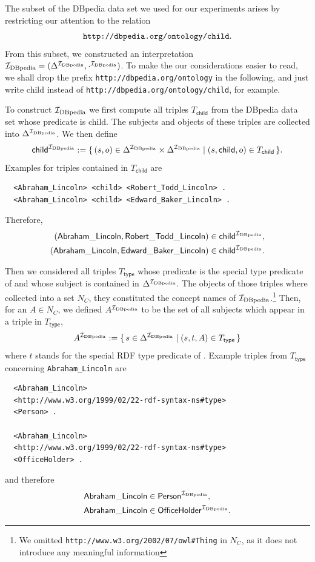 The subset of the DBpedia data set we used for our experiments arises by restricting our
attention to the relation
\begin{equation*}
  \verb|http://dbpedia.org/ontology/child|.
\end{equation*}
From this subset, we constructed an interpretation ${\mathcal{I}_{\text{DBpedia}}} = (\Delta^{{\mathcal{I}_{\text{DBpedia}}}},
\cdot^{{\mathcal{I}_{\text{DBpedia}}}})$.  To make the our considerations easier to read, we shall drop the
prefix \verb|http://dbpedia.org/ontology| in the following, and just write \textsf{child}
instead of \texttt{http://dbpedia.org/ontology/child}, for example.

To construct ${\mathcal{I}_{\text{DBpedia}}}$ we first compute all triples $T_{\mathsf{child}}$ from the
DBpedia data set whose predicate is \textsf{child}.  The subjects and objects of these
triples are collected into $\Delta^{{\mathcal{I}_{\text{DBpedia}}}}$.  We then define
\begin{equation*}
  \mathsf{child}^{{\mathcal{I}_{\text{DBpedia}}}} := {\{\, (s, o) \in \Delta^{\mathcal{I}_{\text{DBpedia}}} \times \Delta^{\mathcal{I}_{\text{DBpedia}}}
    \mid (s, \mathsf{child}, o) \in T_{\mathsf{child}} \,\}}.
\end{equation*}
Examples for triples contained in $T_{\mathsf{child}}$ are
\begin{verbatim}
  <Abraham_Lincoln> <child> <Robert_Todd_Lincoln> .
  <Abraham_Lincoln> <child> <Edward_Baker_Lincoln> .
\end{verbatim}
Therefore,
\begin{align*}
  (\mathsf{Abraham\_Lincoln}, \mathsf{Robert\_Todd\_Lincoln}) &\in \mathsf{child}^{{\mathcal{I}_{\text{DBpedia}}}},\\
  (\mathsf{Abraham\_Lincoln}, \mathsf{Edward\_Baker\_Lincoln}) &\in \mathsf{child}^{{\mathcal{I}_{\text{DBpedia}}}}.
\end{align*}

Then we considered all triples $T_{\mathsf{type}}$ whose predicate is the special type
predicate of  and whose subject is contained in $\Delta^{{\mathcal{I}_{\text{DBpedia}}}}$.  The
objects of those triples where collected into a set $N_C$, \ie they constituted the
concept names of ${\mathcal{I}_{\text{DBpedia}}}$.\footnote{We omitted
  \texttt{http://www.w3.org/2002/07/owl\#Thing} in $N_C$, as it does not introduce any
  meaningful information} Then, for an $A \in N_C$, we defined $A^{{\mathcal{I}_{\text{DBpedia}}}}$ to be the
set of all subjects which appear in a triple in $T_{\mathsf{type}}$, \ie
\begin{equation*}
  A^{{\mathcal{I}_{\text{DBpedia}}}} := {\{\, s \in \Delta^{{\mathcal{I}_{\text{DBpedia}}}} \mid (s, t, A) \in
    T_{\mathsf{type}} \,\}}
\end{equation*}
where $t$ stands for the special RDF type predicate of .  Example triples from
$T_{\mathsf{type}}$ concerning \verb|Abraham_Lincoln| are
\begin{verbatim}
  <Abraham_Lincoln>
  <http://www.w3.org/1999/02/22-rdf-syntax-ns#type>
  <Person> .

  <Abraham_Lincoln>
  <http://www.w3.org/1999/02/22-rdf-syntax-ns#type>
  <OfficeHolder> .
\end{verbatim}
and therefore
\begin{align*}
  \mathsf{Abraham\_Lincoln} &\in \mathsf{Person}^{{\mathcal{I}_{\text{DBpedia}}}}, \\
  \mathsf{Abraham\_Lincoln} &\in \mathsf{OfficeHolder}^{{\mathcal{I}_{\text{DBpedia}}}}.
\end{align*}

